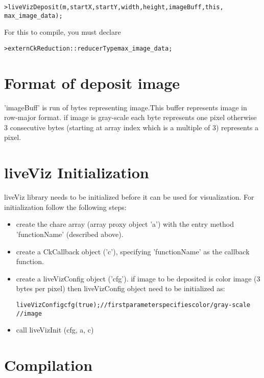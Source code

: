 \begin{alltt}
 > liveVizDeposit (m, startX, startY, width, height, imageBuff, this, 
                   max_image_data);
\end{alltt}

For this to compile, you must declare 

\begin{alltt}
 > extern CkReduction::reducerType max_image_data;
\end{alltt}

\section{Format of deposit image}

'imageBuff' is run of bytes representing image.This buffer represents image in 
row-major format. if image is gray-scale each byte represents one pixel 
otherwise 3 consecutive bytes (starting at array index which is a multiple of 3)
 represents a pixel.

\section{liveViz Initialization}

liveViz library needs to be initialized before it can be used for 
visualization. For initialization follow the following steps:
\begin{itemize}
\item create the chare array (array proxy object 'a') with the entry 
      method 'functionName' (described above).
\item create a CkCallback object ('c'), specifying 'functionName' as the 
      callback function.
\item create a liveVizConfig object ('cfg'). if image to be deposited is color 
      image (3 bytes per pixel) then liveVizConfig object need to be initialized
      as:
\begin{alltt}
          liveVizConfig cfg (true);// first parameter specifies color/gray-scale
                                   // image
\end{alltt}

\item call liveVizInit (cfg, a, c)
\end{itemize}

\section{Compilation}

